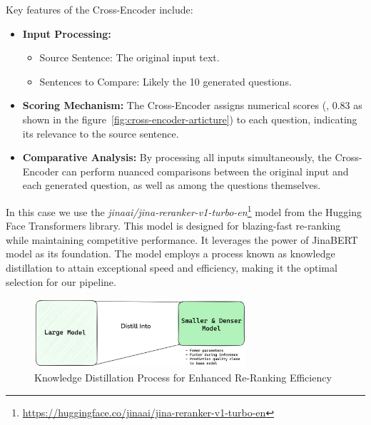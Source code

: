 Key features of the Cross-Encoder include:

\begin{itemize}
    \item \textbf{Input Processing:}
    \begin{itemize}
        \item Source Sentence: The original input text.
        \item Sentences to Compare: Likely the 10 generated questions.
    \end{itemize}
    \item \textbf{Scoring Mechanism:} The Cross-Encoder assigns numerical scores (\eg, 0.83 as shown in the figure~\ref{fig:cross-encoder-articture}) to each question, indicating its relevance to the source sentence.
    \item \textbf{Comparative Analysis:} By processing all inputs simultaneously, the Cross-Encoder can perform nuanced comparisons between the original input and each generated question, as well as among the questions themselves.
\end{itemize}

In this case we use the \textit{jinaai/jina-reranker-v1-turbo-en}\footnote{\url{https://huggingface.co/jinaai/jina-reranker-v1-turbo-en}} model from the Hugging Face Transformers library.
This model is designed for blazing-fast re-ranking while maintaining competitive performance.
It leverages the power of JinaBERT~\cite{günther2024jinaembeddings28192token} model as its foundation.
The model employs a process known as knowledge distillation to attain exceptional speed and efficiency, making it the optimal selection for our pipeline.

\begin{figure}[ht!]
    \centering
    \begin{minipage}[b]{\textwidth}
        \centering
        \includegraphics[width=0.7\textwidth]{res/knowledge-distill}
    \end{minipage}
    \caption{Knowledge Distillation Process for Enhanced Re-Ranking Efficiency}
    \label{fig:knowledge-distill}
\end{figure}
